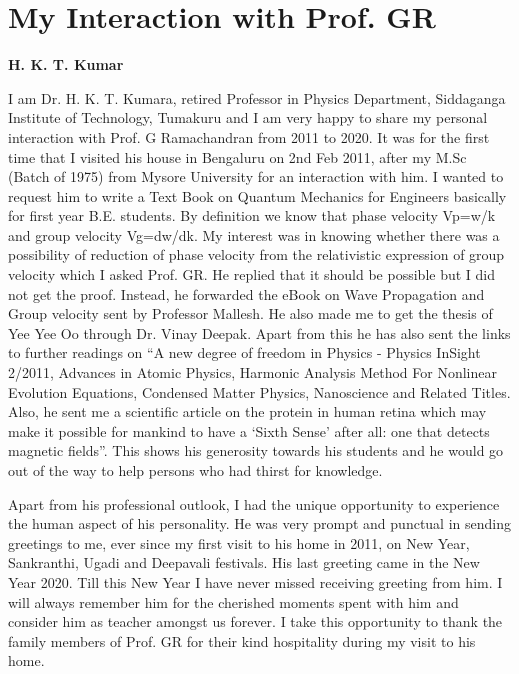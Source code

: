 \chapter{My Interaction with Prof. GR}


\begin{center}
\textbf{H. K. T. Kumar}
\end{center}

\medskip

I am Dr. H. K. T. Kumara, retired Professor in Physics Department, Siddaganga Institute of Technology, Tumakuru and I am very happy to share my personal interaction with Prof. G Ramachandran from 2011 to 2020. It was for the first time that I visited his house in Bengaluru on 2nd Feb 2011, after my M.Sc (Batch of 1975) from Mysore University for an interaction with him. I wanted to request him to write a Text Book on Quantum Mechanics for Engineers basically for first year B.E. students. By definition we know that phase velocity Vp=w/k and group velocity Vg=dw/dk.  My interest was in knowing whether there was a possibility of reduction of phase velocity from the relativistic expression of group velocity which I asked Prof. GR.  He replied that it should be possible but I did not get the proof. Instead, he forwarded the eBook on Wave Propagation and Group velocity sent by Professor Mallesh.  He also made me to get the thesis of Yee Yee Oo through Dr. Vinay Deepak. Apart from this he has also sent the links to further readings on “A new degree of freedom in Physics - Physics InSight 2/2011, Advances in Atomic Physics, Harmonic Analysis Method For Nonlinear Evolution Equations, Condensed Matter Physics, Nanoscience and Related Titles.  Also, he sent me a scientific article on the protein in human retina which may make it possible for mankind to have a ‘Sixth Sense’ after all: one that detects magnetic fields”. This shows his generosity towards his students and he would go out of the way to help persons who had thirst for knowledge. 

Apart from his professional outlook, I had the unique opportunity to experience the human aspect of his personality.  He was very prompt and punctual in sending greetings to me, ever since my first visit to his home in 2011, on New Year, Sankranthi, Ugadi and Deepavali festivals.  His last greeting came in the New Year 2020.  Till this New Year I have never missed receiving greeting from him. I will always remember him for the cherished  moments spent with him and consider him as teacher amongst us forever. I take this opportunity to thank the family members of Prof. GR for their kind hospitality during my visit to his home.


